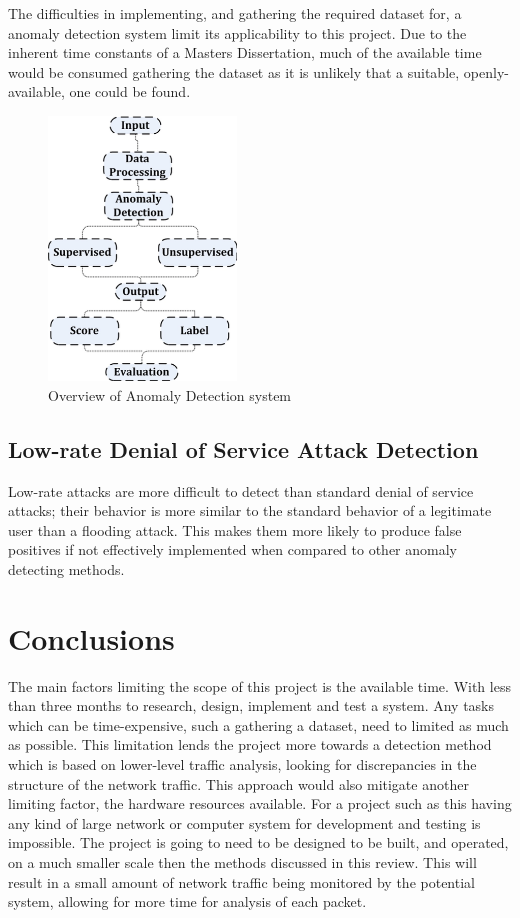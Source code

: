 \documentclass[conference, a4paper]{IEEEtran}
\begin{document}
        The difficulties in implementing, and gathering the required dataset for, a anomaly detection system limit its applicability to this project.
        Due to the inherent time constants of a Masters Dissertation, much of the available time would be consumed gathering the dataset as it is unlikely that a suitable, openly-available, one could be found.

        \begin{figure}
            \centering
            \includegraphics[width=5cm]{images/anomaly_diagram.png}
            \caption{Overview of Anomaly Detection system \cite{anomaly_survey}}
            \label{fig:anomaly_overview}
        \end{figure}

    \subsection{Low-rate Denial of Service Attack Detection}
        Low-rate attacks are more difficult to detect than standard denial of service attacks; their behavior is more similar to the standard behavior of a legitimate user than a flooding attack.
        This makes them more likely to produce false positives if not effectively implemented when compared to other anomaly detecting methods. 
        

\section{Conclusions}
    The main factors limiting the scope of this project is the available time.
    With less than three months to research, design, implement and test a system. Any tasks which can be time-expensive, such a gathering a dataset, need to limited as much as possible.
    This limitation lends the project more towards a detection method which is based on lower-level traffic analysis, looking for discrepancies in the structure of the network traffic.
    This approach would also mitigate another limiting factor, the hardware resources available. For a project such as this having any kind of large network or computer system for development and testing is impossible.
    The project is going to need to be designed to be built, and operated, on a much smaller scale then the methods discussed in this review.
    This will result in a small amount of network traffic being monitored by the potential system, allowing for more time for analysis of each packet.
\end{document}
